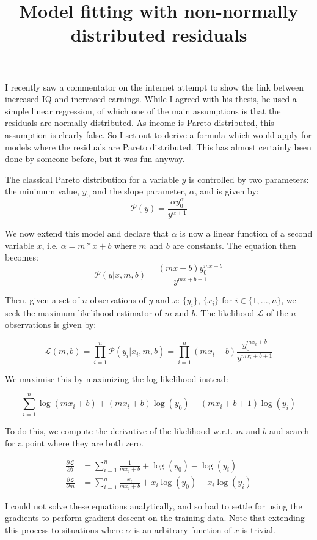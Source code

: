 \documentclass[]{article}
\title{Model fitting with non-normally distributed residuals}
\begin{document}
\maketitle

I recently saw a commentator on the internet attempt to show the link between increased IQ and increased earnings. While I agreed with his thesis, he used a simple linear regression, of which one of the main assumptions is that the residuals are normally distributed. As income is Pareto distributed, this assumption is clearly false.
So I set out to derive a formula which would apply for models where the residuals are Pareto distributed. This has almost certainly been done by someone before, but it was fun anyway. \newline

The classical Pareto distribution for a variable $y$ is controlled by two parameters: the minimum value, $y_0$ and the slope parameter, $\alpha$, and is given by:
\begin{equation}
\mathcal{P}(y) = \frac{\alpha y_0^\alpha}{y^{\alpha + 1}}
\end{equation} 

We now extend this model and declare that $\alpha$ is now a linear function of a second variable $x$, i.e. $\alpha = m * x + b$ where $m$ and $b$ are constants.
The equation then becomes:
\begin{equation}
\mathcal{P}(y|x, m, b) = \frac{(mx + b) y_0^{mx + b}}{y^{mx + b + 1}}
\end{equation} 

Then, given a set of $n$ observations of $y$ and $x$: $\{y_i\}$, $\{x_i\}$ for $i \in \{1 ,..., n\}$, we seek the maximum likelihood estimator of $m$ and $b$. The likelihood $\mathcal{L}$ of the $n$ observations is given by:

\begin{equation}
 \mathcal{L}(m, b) = \prod_{i = 1}^n {\mathcal{P}(y_i|x_i, m, b)} = \prod_{i = 1}^n (mx_i + b)\frac{y_0^{mx_i + b}}{y^{mx_i + b + 1}}
\end{equation}

We maximise this by maximizing the log-likelihood instead:

\begin{equation}
\sum_{i = 1}^n \log(mx_i + b) + (mx_i + b)\log (y_0) - (mx_i + b + 1) \log(y_i)
\end{equation}

To do this, we compute the derivative of the likelihood w.r.t. $m$ and $b$ and search for a point where they are both zero.

\begin{align}
\frac{\partial \mathcal{L}}{\partial b} &= \sum_{i = 1}^n \frac{1}{mx_i + b} + \log (y_0) - \log(y_i) \\
\frac{\partial \mathcal{L}}{\partial m} &= \sum_{i = 1}^n \frac{x_i}{mx_i + b} + x_i\log (y_0) - x_i\log(y_i)
\end{align}

I could not solve these equations analytically, and so had to settle for using the gradients to perform gradient descent on the training data. 
Note that extending this process to situations where $\alpha$ is an arbitrary function of $x$ is trivial.
\end{document}
